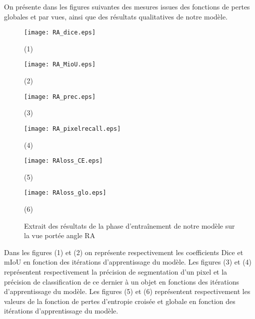 On présente dans les figures suivantes des mesures issues des fonctions de pertes globales et par vues, ainsi que des résultats qualitatives de notre modèle. 

\newpage
\begin{figure}[hbt!]
  \centering
  \begin{minipage}{0.45\linewidth}
    \centering
    \texttt{[image: RA\_dice.eps]}
    \caption{(1)}
  \end{minipage}
  \begin{minipage}{0.45\linewidth}
    \texttt{[image: RA\_MioU.eps]}   
   \caption{(2)}
  \end{minipage}
  \hfill
  \begin{minipage}{0.45\linewidth}
    \centering
    \texttt{[image: RA\_prec.eps]}
    \caption{(3)}
  \end{minipage}
  \begin{minipage}{0.45\linewidth}

    \texttt{[image: RA\_pixelrecall.eps]}
    \caption{(4)}
  \end{minipage}
  \begin{minipage}{0.45\linewidth}
    \centering
    \texttt{[image: RAloss\_CE.eps]}
    \caption{(5)}
  \end{minipage}
  \begin{minipage}{0.45\linewidth}
    \texttt{[image: RAloss\_glo.eps]}
    \caption{(6)}
  \end{minipage}
  \caption{Extrait des résultats de la phase d'entraînement de notre modèle sur la vue portée angle RA}
  \label{fig:115}
\end{figure}
Dans les figures (1) et (2) on représente respectivement les coefficients Dice et mIoU en fonction des itérations d'apprentissage du modèle. Les figures (3) et (4) représentent respectivement la précision de segmentation d'un pixel et la précision de classification de ce dernier à un objet en fonctions des itérations d'apprentissage du modèle. Les figures (5) et (6) représentent respectivement les valeurs de la fonction de pertes d'entropie croisée et globale en fonction des itérations d'apprentissage du modèle.

